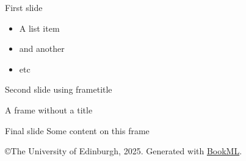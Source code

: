 \documentclass{article}
\begin{document}
\iflatexml\else
    \frame{\titlepage}
\fi


\begin{frame}{First slide}
    \begin{itemize}
        \item A list item
        \item and another
        \item etc
    \end{itemize}

\end{frame}

\begin{frame}{Second slide using frametitle}
\end{frame}

\begin{frame}{}
    A frame without a title
\end{frame}

\begin{frame}{Final slide}
    Some content on this frame
\end{frame}






\iflatexml
    \copyright The University of Edinburgh, 2025. Generated with \href{https://vlmantova.github.io/bookml/}{BookML}.
\fi
\end{document}
